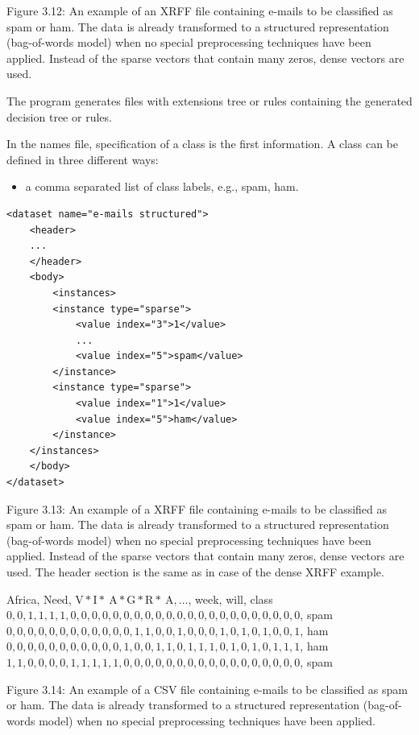 \documentclass[10pt]{book}
\begin{document}
Figure 3.12: An example of an XRFF file containing e-mails to be classified as spam or ham. The data is already transformed to a structured representation (bag-of-words model) when no special preprocessing techniques have been applied. Instead of the sparse vectors that contain many zeros, dense vectors are used.

The program generates files with extensions tree or rules containing the generated decision tree or rules.

In the names file, specification of a class is the first information. A class can be defined in three different ways:

\begin{itemize}
  \item a comma separated list of class labels, e.g., spam, ham.
\end{itemize}

\begin{verbatim}
<dataset name="e-mails structured">
    <header>
    ...
    </header>
    <body>
        <instances>
        <instance type="sparse">
            <value index="3">1</value>
            ...
            <value index="5">spam</value>
        </instance>
        <instance type="sparse">
            <value index="1">1</value>
            <value index="5">ham</value>
        </instance>
    </instances>
    </body>
</dataset>
\end{verbatim}

Figure 3.13: An example of a XRFF file containing e-mails to be classified as spam or ham. The data is already transformed to a structured representation (bag-of-words model) when no special preprocessing techniques have been applied. Instead of the sparse vectors that contain many zeros, dense vectors are used. The header section is the same as in case of the dense XRFF example.

Africa, Need, $\mathrm{V} * \mathrm{I} * \mathrm{~A} * \mathrm{G} * \mathrm{R} * \mathrm{~A}, \ldots$, week, will, class\\
$0,0,1,1,1,1,0,0,0,0,0,0,0,0,0,0,0,0,0,0,0,0,0,0,0,0,0,0$, spam\\
$0,0,0,0,0,0,0,0,0,0,0,0,1,1,0,0,1,0,0,0,1,0,1,0,1,0,0,1$, ham\\
$0,0,0,0,0,0,0,0,0,0,0,1,0,0,1,1,0,1,1,1,0,1,0,1,0,1,1,1$, ham\\
$1,1,0,0,0,0,1,1,1,1,1,0,0,0,0,0,0,0,0,0,0,0,0,0,0,0,0,0$, spam

Figure 3.14: An example of a CSV file containing e-mails to be classified as spam or ham. The data is already transformed to a structured representation (bag-of-words model) when no special preprocessing techniques have been applied.
\end{document}
